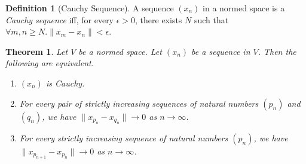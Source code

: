 \documentclass{book}
\newtheorem{thm}[ax]{Theorem}
\theoremstyle{definition}
\newtheorem{df}[ax]{Definition}
\begin{document}
\begin{df}[Cauchy Sequence]
A sequence $(x_n)$ in a normed space is a \emph{Cauchy sequence} iff, for every $\epsilon > 0$, there exists $N$ such that $\forall m,n \geq N. \| x_m - x_n \| < \epsilon$.
\end{df}

\begin{thm}
\label{thm:Cauchy}
Let $V$ be a normed space. Let $(x_n)$ be a sequence in $V$. Then the following are equivalent.
\begin{enumerate}
\item $(x_n)$ is Cauchy.
\item For every pair of strictly increasing sequences of natural numbers $(p_n)$ and $(q_n)$, we have $\| x_{p_n} - x_{q_n} \| \rightarrow 0$ as $n \rightarrow \infty$.
\item For every strictly increasing sequence of natural numbers $(p_n)$, we have $\| x_{p_{n+1}} - x_{p_n} \| \rightarrow 0$ as $n \rightarrow \infty$.
\end{enumerate}
\end{thm}
\end{document}
